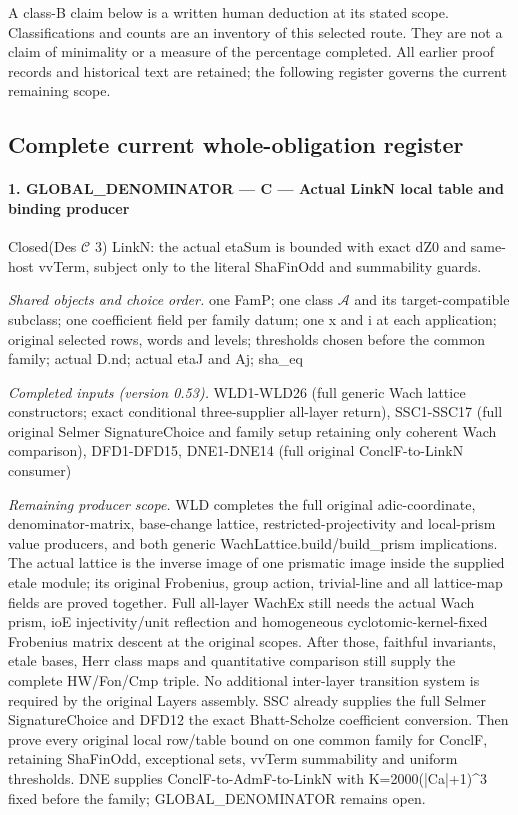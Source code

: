 \documentclass[11pt,a4paper]{article}
\numberwithin{equation}{section}
\theoremstyle{remark}\newtheorem{remark}[theorem]{Remark}
\begin{document}
A class-B claim below is a written human deduction at its stated scope.
Classifications and counts are an inventory of this selected route.
They are not a claim of minimality or a measure of the percentage
completed. All earlier proof records and historical text are retained;
the following register governs the current remaining scope.

\subsection{Complete current whole-obligation register}


\paragraph{1. GLOBAL\_\allowbreak DENOMINATOR — C — Actual LinkN local table and binding producer}

Closed(Des $\mathcal C$ 3) LinkN: the actual etaSum is bounded with exact dZ0 and same-host vvTerm, subject only to the literal ShaFinOdd and summability guards.

\emph{Shared objects and choice order.} one FamP; one class $\mathcal A$ and its target-compatible subclass; one coefficient field per family datum; one x and i at each application; original selected rows, words and levels; thresholds chosen before the common family; actual D.nd; actual etaJ and Aj; sha\_\allowbreak eq

\emph{Completed inputs (version 0.53).} WLD1-WLD26 (full generic Wach lattice constructors; exact conditional three-supplier all-layer return), SSC1-SSC17 (full original Selmer SignatureChoice and family setup retaining only coherent Wach comparison), DFD1-DFD15, DNE1-DNE14 (full original ConclF-to-LinkN consumer)

\emph{Remaining producer scope.} WLD completes the full original adic-coordinate, denominator-matrix, base-change lattice, restricted-projectivity and local-prism value producers, and both generic WachLattice.build/build\_\allowbreak prism implications. The actual lattice is the inverse image of one prismatic image inside the supplied etale module; its original Frobenius, group action, trivial-line and all lattice-map fields are proved together. Full all-layer WachEx still needs the actual Wach prism, ioE injectivity/unit reflection and homogeneous cyclotomic-kernel-fixed Frobenius matrix descent at the original scopes. After those, faithful invariants, etale bases, Herr class maps and quantitative comparison still supply the complete HW/Fon/Cmp triple. No additional inter-layer transition system is required by the original Layers assembly. SSC already supplies the full Selmer SignatureChoice and DFD12 the exact Bhatt-Scholze coefficient conversion. Then prove every original local row/table bound on one common family for ConclF, retaining ShaFinOdd, exceptional sets, vvTerm summability and uniform thresholds. DNE supplies ConclF-to-AdmF-to-LinkN with K=2000(|Ca|+1)\textasciicircum{}3 fixed before the family; GLOBAL\_\allowbreak DENOMINATOR remains open.
\end{document}
